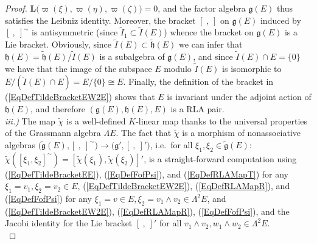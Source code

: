 \documentclass [11pt] {article}
\theoremstyle{definition}
\begin{document}
\begin{proof}
	$\mathbf{L}\big(\varpi(\xi),\varpi(\eta),\varpi(\zeta)\big)=0$, and
	the factor algebra  $\mathfrak{g}(E)$ thus satisfies the Leibniz identity.
	 Moreover, the bracket $[~,~]$ on 
	$\mathfrak{g}(E)$ induced by $[~,~]^\sim$ is antisymmetric (since $\tilde{I}_1\subset\tilde{I}(E)$)	
    whence the bracket on $\mathfrak{g}(E)$ is a Lie bracket.
    Obviously, since $\tilde{I}(E)\subset \tilde{\mathfrak{h}}(E)$ we can infer that $\mathfrak{h}(E)=\tilde{\mathfrak{h}}(E)/\tilde{I}(E)$
    	is a subalgebra of $\mathfrak{g}(E)$, and since $\tilde{I}(E)\cap E=\{0\}$ we have that the image of the subspace
    	$E$ modulo $\tilde{I}(E)$ is isomorphic to
    $E/(\tilde{I}(E)\cap E)=E/\{0\}\cong E$.  Finally, the definition of the
    	bracket in (\ref{EqDefTildeBracketEW2E}) shows that
    $E$ is invariant under the adjoint action of
    $\mathfrak{h}(E)$, and therefore 
    $(\mathfrak{g}(E),\mathfrak{h}(E),E)$ is a RLA pair.\\
    \textit{iii.)} The map $\tilde{\chi}$
    is a well-defined $K$-linear map thanks to the universal properties of the Grassmann algebra $\Lambda E$. The fact that $\tilde{\chi}$
    is a morphism of nonassociative algebras $\big(\tilde{\mathfrak{g}}(E),[~,~]^\sim\big)
    \to \big(\mathfrak{g}',[~,~]'\big)$, i.e.~for all $\xi_1,\xi_2\in \tilde{\mathfrak{g}}(E)$: 
    $\tilde{\chi}([\xi_1,\xi_2]^\sim) =[\tilde{\chi}(\xi_1),\tilde{\chi}(\xi_2)]'$,
    is a straight-forward computation
    using (\ref{EqDefTildeBracketEE}), (\ref{EqDefFofPsi}), and (\ref{EqDefRLAMapT}) for any $\xi_1=v_1,\xi_2=v_2\in E$, 
    (\ref{EqDefTildeBracketEW2E}), (\ref{EqDefRLAMapR}), and (\ref{EqDefFofPsi})
    for any $\xi_1=v\in E,\xi_2=v_1\wedge v_2\in \Lambda^2E$, and
     (\ref{EqDefTildeBracketEW2E}), (\ref{EqDefRLAMapR}), (\ref{EqDefFofPsi}),
    and the Jacobi identity for the Lie bracket $[~,~]'$ for all
    $v_1\wedge v_2,w_1\wedge w_2\in\Lambda^2E$.\\

\end{proof}
\end{document}
